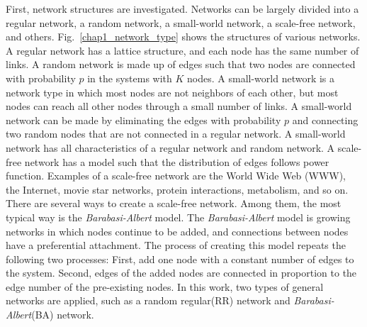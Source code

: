 First, network structures are investigated. Networks can be largely divided into a regular network, a random network\parencite{erdos1960}, a small-world network\parencite{watts1998}, a scale-free network\parencite{barabasi2011}, and others. Fig.~\ref{chap1_network_type} shows the structures of various networks. A regular network has a lattice structure, and each node has the same number of links. A random network is made up of edges such that two nodes are connected with probability $p$ in the systems with $K$ nodes. A small-world network is a network type in which most nodes are not neighbors of each other, but most nodes can reach all other nodes through a small number of links. A small-world network can be made by eliminating the edges with probability $p$ and connecting two random nodes that are not connected in a regular network. A small-world network has all characteristics of a regular network and random network. A scale-free network has a model such that the distribution of edges follows power function. Examples of a scale-free network are the World Wide Web (WWW), the Internet, movie star networks, protein interactions, metabolism, and so on. There are several ways to create a scale-free network. Among them, the most typical way is the \textit{Barabasi-Albert} model. The \textit{Barabasi-Albert} model is growing networks in which nodes continue to be added, and connections between nodes have a preferential attachment. The process of creating this model repeats the following two processes: First, add one node with a constant number of edges to the system. Second, edges of the added nodes are connected in proportion to the edge number of the pre-existing nodes. In this work, two types of general networks are applied, such as a random regular(RR) network and \textit{Barabasi-Albert}(BA) network. 

